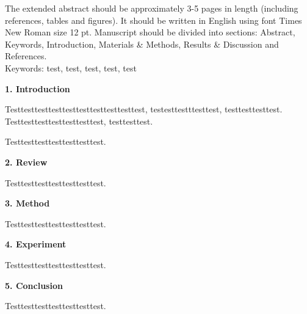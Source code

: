 

\begin{extendedabstract}

The extended abstract should be approximately 3-5 pages in length (including references, tables and figures). It should be written in English using font Times New Roman size 12 pt. Manuscript should be divided into sections: Abstract, Keywords, Introduction, Materials \& Methods, Results \& Discussion and References. 
\\

\noindent
Keywords: test, test, test, test, test

\clearpage %

{\fontsize{16}{18}\selecefont
\noindent
\bf{1. Introduction}}\\
\vspace{-2em}

Testtesttesttesttesttesttesttesttesttest, testesttestttesttest, testtesttesttest. Testtesttesttesttesttesttest, testtesttest.

Testtesttesttesttesttesttest.

\vspace{2em}
{\fontsize{16}{18}\selecefont
\noindent
\bf{2. Review}}\\
\vspace{-2em}

Testtesttesttesttesttesttest.

\vspace{2em}
{\fontsize{16}{18}\selecefont
\noindent
\bf{3. Method}}\\
\vspace{-2em}

Testtesttesttesttesttesttest.

\vspace{2em}
{\fontsize{16}{18}\selecefont
\noindent
\bf{4. Experiment}}\\
\vspace{-2em}

Testtesttesttesttesttesttest.

\vspace{2em}
{\fontsize{16}{18}\selecefont
\noindent
\bf{5. Conclusion}}\\
\vspace{-2em}

Testtesttesttesttesttesttest.

\end{extendedabstract}
